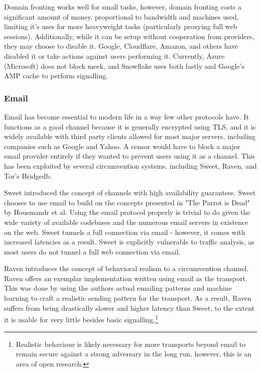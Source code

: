\documentclass[12pt]{report}
\begin{document}
Domain fronting works well for small tasks, however, domain fronting costs a significant amount of money, proportional to bandwidth and machines used, limiting it's uses for more heavyweight tasks (particularly proxying full web sessions). Additionally, while it can be setup without cooperation from providers, they may choose to disable it. Google, Cloudflare, Amazon, and others have disabled it or take actions against users performing it. Currently, Azure (Microsoft) does not block meek, and Snowflake uses both fastly and Google's AMP cache to perform signalling.

\subsubsection{Email}

Email has become essential to modern life in a way few other protocols have. It functions as a good channel because it is generally encrypted using TLS, and it is widely available with third party clients allowed for most major servers, including companies such as Google and Yahoo. A censor would have to block a major email provider entirely if they wanted to prevent users using it as a channel. This has been exploited by several circumvention systems, including Sweet, Raven, and Tor's Bridgedb.

Sweet introduced the concept of channels with high availability guarantees. Sweet chooses to use email to build on the concepts presented in "The Parrot is Dead" by Housmandr et al.\cite{parrot} Using the email protocol properly is trivial to do given the wide variety of available codebases and the numerous email servers in existence on the web. Sweet tunnels a full connection via email - however, it comes with increased latencies as a result. Sweet is explicitly vulnerable to traffic analysis, as most users do not tunnel a full web connection via email.\cite{sweet}

Raven introduces the concept of behavioral realism to a circumvention channel. Raven offers an exemplar implementation written using email as the transport. This was done by using the authors actual emailing patterns and machine learning to craft a realistic sending pattern for the transport. As a result, Raven suffers from being drastically slower and higher latency than Sweet, to the extent it is usable for very little besides basic signalling.\footnote{Realistic behaviour is likely necessary for more transports beyond email to remain secure against a strong adversary in the long run, however, this is an area of open research.}\cite{raven}
\end{document}
